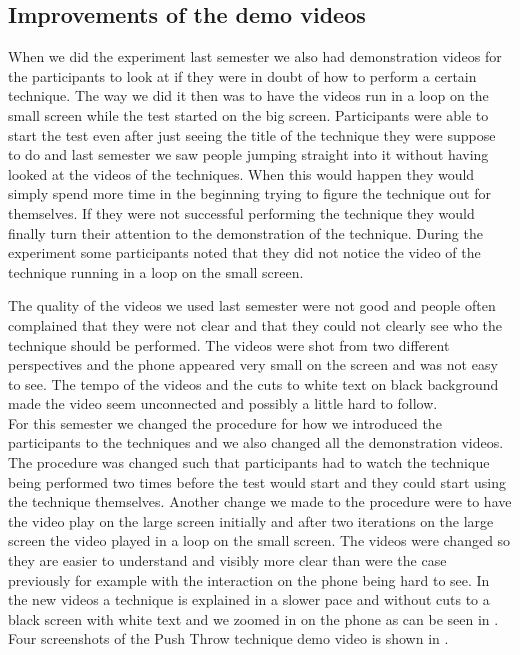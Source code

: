 \subsection*{Improvements of the demo videos}\label{sec:videoslastsemester}
When we did the experiment last semester we also had demonstration videos for the participants to look at if they were in doubt of how to perform a certain technique.
The way we did it then was to have the videos run in a loop on the small screen while the test started on the big screen.
Participants were able to start the test even after just seeing the title of the technique they were suppose to do and last semester we saw people jumping straight into it without having looked at the videos of the techniques. 
When this would happen they would simply spend more time in the beginning trying to figure the technique out for themselves.
If they were not successful performing the technique they would finally turn their attention to the demonstration of the technique.
During the experiment some participants noted that they did not notice the video of the technique running in a loop on the small screen.

The quality of the videos we used last semester were not good and people often complained that they were not clear and that they could not clearly see who the technique should be performed.
The videos were shot from two different perspectives and the phone appeared very small on the screen and was not easy to see.
The tempo of the videos and the cuts to white text on black background made the video seem unconnected and possibly a little hard to follow.\\

For this semester we changed the procedure for how we introduced the participants to the techniques and we also changed all the demonstration videos.
The procedure was changed such that participants had to watch the technique being performed two times before the test would start and they could start using the technique themselves.
Another change we made to the procedure were to have the video play on the large screen initially and after two iterations on the large screen the video played in a loop on the small screen.
The videos were changed so they are easier to understand and visibly more clear than were the case previously for example with the interaction on the phone being hard to see.
In the new videos a technique is explained in a slower pace and without cuts to a black screen with white text and we zoomed in on the phone as can be seen in .
Four screenshots of the Push Throw technique demo video is shown in .

